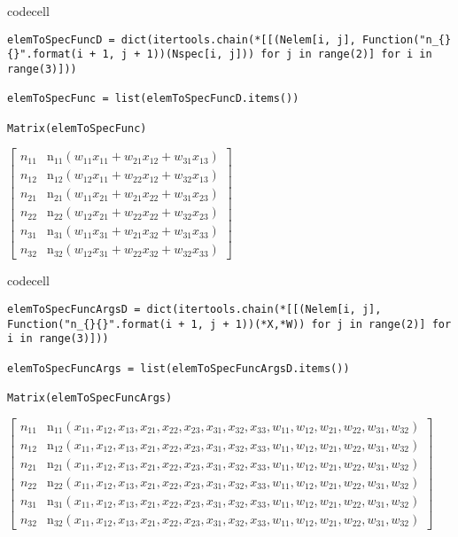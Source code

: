 codecell

\begin{verbatim}
elemToSpecFuncD = dict(itertools.chain(*[[(Nelem[i, j], Function("n_{}{}".format(i + 1, j + 1))(Nspec[i, j])) for j in range(2)] for i in range(3)]))

elemToSpecFunc = list(elemToSpecFuncD.items())

Matrix(elemToSpecFunc)
\end{verbatim}

$\displaystyle \left[\begin{matrix}n_{11} & \operatorname{n_{11}}{\left(w_{11} x_{11} + w_{21} x_{12} + w_{31} x_{13} \right)}\\n_{12} & \operatorname{n_{12}}{\left(w_{12} x_{11} + w_{22} x_{12} + w_{32} x_{13} \right)}\\n_{21} & \operatorname{n_{21}}{\left(w_{11} x_{21} + w_{21} x_{22} + w_{31} x_{23} \right)}\\n_{22} & \operatorname{n_{22}}{\left(w_{12} x_{21} + w_{22} x_{22} + w_{32} x_{23} \right)}\\n_{31} & \operatorname{n_{31}}{\left(w_{11} x_{31} + w_{21} x_{32} + w_{31} x_{33} \right)}\\n_{32} & \operatorname{n_{32}}{\left(w_{12} x_{31} + w_{22} x_{32} + w_{32} x_{33} \right)}\end{matrix}\right]$

codecell

\begin{verbatim}
elemToSpecFuncArgsD = dict(itertools.chain(*[[(Nelem[i, j], Function("n_{}{}".format(i + 1, j + 1))(*X,*W)) for j in range(2)] for i in range(3)]))

elemToSpecFuncArgs = list(elemToSpecFuncArgsD.items())

Matrix(elemToSpecFuncArgs)
\end{verbatim}

$\displaystyle \left[\begin{matrix}n_{11} & \operatorname{n_{11}}{\left(x_{11},x_{12},x_{13},x_{21},x_{22},x_{23},x_{31},x_{32},x_{33},w_{11},w_{12},w_{21},w_{22},w_{31},w_{32} \right)}\\n_{12} & \operatorname{n_{12}}{\left(x_{11},x_{12},x_{13},x_{21},x_{22},x_{23},x_{31},x_{32},x_{33},w_{11},w_{12},w_{21},w_{22},w_{31},w_{32} \right)}\\n_{21} & \operatorname{n_{21}}{\left(x_{11},x_{12},x_{13},x_{21},x_{22},x_{23},x_{31},x_{32},x_{33},w_{11},w_{12},w_{21},w_{22},w_{31},w_{32} \right)}\\n_{22} & \operatorname{n_{22}}{\left(x_{11},x_{12},x_{13},x_{21},x_{22},x_{23},x_{31},x_{32},x_{33},w_{11},w_{12},w_{21},w_{22},w_{31},w_{32} \right)}\\n_{31} & \operatorname{n_{31}}{\left(x_{11},x_{12},x_{13},x_{21},x_{22},x_{23},x_{31},x_{32},x_{33},w_{11},w_{12},w_{21},w_{22},w_{31},w_{32} \right)}\\n_{32} & \operatorname{n_{32}}{\left(x_{11},x_{12},x_{13},x_{21},x_{22},x_{23},x_{31},x_{32},x_{33},w_{11},w_{12},w_{21},w_{22},w_{31},w_{32} \right)}\end{matrix}\right]$

